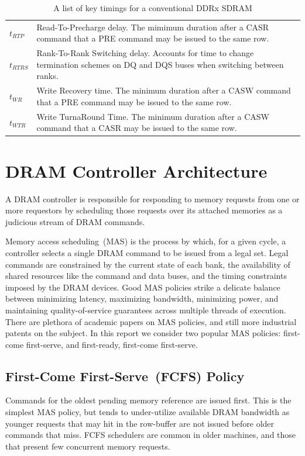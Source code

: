 \begin{table}[htb]
\begin{center}
{\begin{tabular}{|p{}|p{}|}
    \textbf{$t_{RTP}$} & Read-To-Precharge delay. The mimimum duration after a CASR command that a PRE command may be issued to the same row. \\
    \textbf{$t_{RTRS}$} & Rank-To-Rank Switching delay. Accounts for time to change termination schemes on DQ and DQS buses when switching between ranks. \\
    \textbf{$t_{WR}$} & Write Recovery time. The minimum duration after a CASW command that a PRE command may be issued to the same row. \\
    \textbf{$t_{WTR}$} & Write TurnaRound Time. The minimum duration after a CASW command that a CASR may be issued to the same row. \\
    \hline
\end{tabular}}
\end{center}
\caption{A list of key timings for a conventional DDRx SDRAM}
\label{tbl:dram-timings}
\end{table}%

\clearpage
\section{DRAM Controller Architecture}

A DRAM controller is responsible for responding to memory
requests from one or more requestors by scheduling those requests over its
attached memories as a judicious stream of DRAM commands.

Memory access scheduling~(MAS) is the process by which, for a given cycle, a
controller selects a single DRAM command to be issued from a legal set. Legal
commands are constrained by the current state of each bank, the availability of
shared resources like the command and data buses, and the timing constraints
imposed by the DRAM devices. Good MAS policies strike a delicate balance
between minimizing latency, maximizing bandwidth, minimizing power, and
maintaining quality-of-service guarantees across multiple threads of execution.
There are plethora of academic papers on MAS policies, and still more
industrial patents on the subject. In this report we consider two popular MAS
policies: first-come first-serve, and first-ready, first-come first-serve.

\subsection{First-Come First-Serve~(FCFS) Policy}\label{sec:fcfs} Commands for the
oldest pending memory reference are issued first. This is the simplest MAS
policy, but tends to under-utilize available DRAM bandwidth as younger requests
that may hit in the row-buffer are not issued before older commands that miss.
FCFS schedulers are common in older machines, and those that present few
concurrent memory requests.

